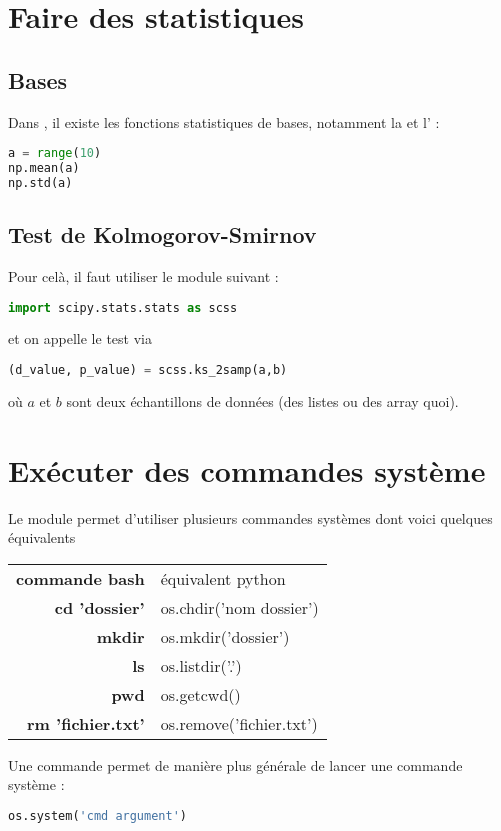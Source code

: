 \documentclass[a4paper,twoside]{article}
\begin{document}
\section{Faire des statistiques}
\subsection{Bases}
Dans , il existe les fonctions statistiques de bases, notamment la  et l' :
\begin{lstlisting}[language=python]
a = range(10)
np.mean(a)
np.std(a)
\end{lstlisting}



\subsection{Test de Kolmogorov-Smirnov}
Pour celà, il faut utiliser le module suivant :
\begin{lstlisting}[language=python]
import scipy.stats.stats as scss
\end{lstlisting}
et on appelle le test via
\begin{lstlisting}[language=python]
(d_value, p_value) = scss.ks_2samp(a,b)
\end{lstlisting}
où $a$ et $b$ sont deux échantillons de données (des listes ou des array quoi).





\section{Exécuter des commandes système}
Le module  permet d'utiliser plusieurs commandes systèmes dont voici quelques équivalents

\begin{tabular}{>{\bfseries}r<{}@{ : }p{11cm}}
commande bash & équivalent python\\
cd 'dossier' & os.chdir('nom dossier')\\
mkdir & os.mkdir('dossier')\\
ls & os.listdir('.')\\
pwd & os.getcwd()\\
rm 'fichier.txt' & os.remove('fichier.txt')
\end{tabular}

Une commande permet de manière plus générale de lancer une commande système :
\begin{lstlisting}[language=python]
os.system('cmd argument')
\end{lstlisting}
\end{document}
